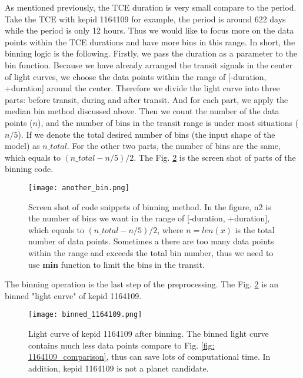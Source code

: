       As mentioned previously, the TCE duration is very small compare to the period. 
      Take the TCE with kepid 1164109 for example, the period is around 622 days while 
      the period is only 12 hours. Thus we would like to focus more on the data points within 
      the TCE durations and have more bins in this range. In short, the binning logic is the 
      following. Firstly, we pass the duration as a parameter to the bin function. Because 
      we have already arranged the transit signals in the center of light curves, 
      we choose the data points within the range of [-duration, +duration] around the center.
      Therefore we divide the light curve into three parts: before transit, during and after 
      transit. And for each part, we apply the median bin method discussed above.
      Then we count the number of the data points ($n$), and the number of bins in the 
      transit range is  under most situations ($n/5$). If we denote the 
      total desired number of bins (the input shape of the model) as $n\_total$.
      For the other two parts, the number of bins are the same, which equals to 
      $\left(n\_total-n/5\right)/2$. The Fig. \ref{fig: binning_method} is the 
      screen shot of parts of the binning code.

      \begin{figure}[!htp]
        \centering
        \texttt{[image: another\_bin.png]}
        \caption[Screen shot of code snippets of binning method.]
          {Screen shot of code snippets of binning method. In the figure, n2 is the 
          number of bins we want in the range of [-duration, +duration], which equals 
          to $\left(n\_total-n/5\right)/2$, where $n=len(x)$ is the total number of 
          data points. Sometimes a there are too many data points within the range and 
          exceeds the total bin number, thus we need to use \textbf{min} function to 
          limit the bins in the transit.}
        \label{fig: binning_method}
      \end{figure}

      The binning operation is the last step of the preprocessing. 
      The Fig. \ref{fig: binning_method} is an binned "light curve" of kepid 1164109.

      \begin{figure}[!htp]
        \centering
        \texttt{[image: binned\_1164109.png]}
        \caption[Light curve of kepid 1164109 after binning. ]
          {Light curve of kepid 1164109 after binning. The binned light curve 
          contains much less data points compare to Fig. 
          \ref{fig: 1164109_comparison}, thus can save lots of computational time. 
          In addition, kepid 1164109 is not a planet candidate.}
        \label{fig: binning_method}
      \end{figure}

